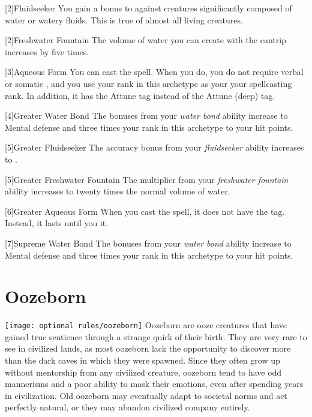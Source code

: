         [2]{Fluidseeker} You gain a  bonus to  against creatures significantly composed of water or watery fluids.
        This is true of almost all living creatures.

        [2]{Freshwater Fountain} The volume of water you can create with the  cantrip increases by five times.

        [3]{Aqueous Form} You can cast the  spell.
        When you do, you do not require verbal or somatic , and you use your rank in this archetype as your your spellcasting rank.
        In addition, it has the Attune tag instead of the Attune (deep) tag.

        [4]{Greater Water Bond} The bonuses from your \textit{water bond} ability increase to  Mental defense and three times your rank in this archetype to your hit points.

        [5]{Greater Fluidseeker} The accuracy bonus from your \textit{fluidseeker} ability increases to .

        [5]{Greater Freshwater Fountain} The multiplier from your \textit{freshwater fountain} ability increases to twenty times the normal volume of water.

        [6]{Greater Aqueous Form} When you cast the  spell, it does not have the  tag.
        Instead, it lasts until you  it.

        [7]{Supreme Water Bond} The bonuses from your \textit{water bond} ability increase to  Mental defense and three times your rank in this archetype to your hit points.

\section{Oozeborn}
    \texttt{[image: optional rules/oozeborn]}
    Oozeborn are ooze creatures that have gained true sentience through a strange quirk of their birth.
    They are very rare to see in civilized lands, as most oozeborn lack the opportunity to discover more than the dark caves in which they were spawned.
    Since they often grow up without mentorship from any civilized creature, oozeborn tend to have odd mannerisms and a poor ability to mask their emotions, even after spending years in civilization.
    Old oozeborn may eventually adapt to societal norms and act perfectly natural, or they may abandon civilized company entirely.

